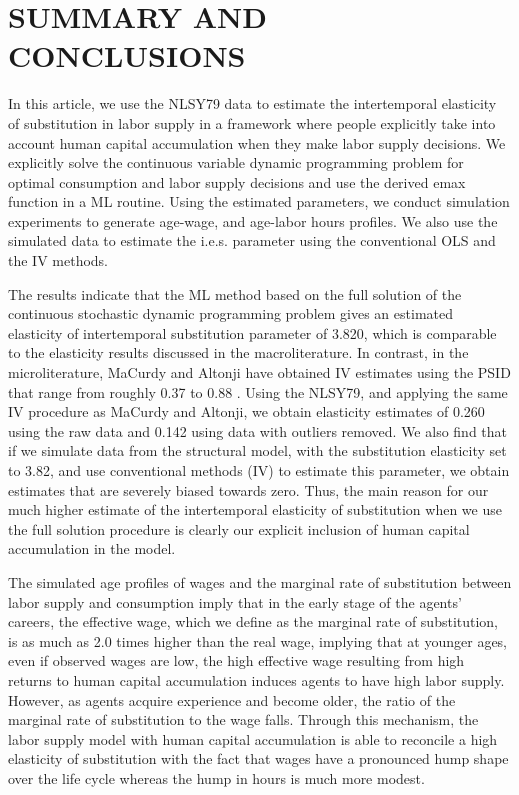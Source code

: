 \documentclass[\econtexRoot/ImaiKeane]{subfiles}
\begin{document}
\section{SUMMARY AND CONCLUSIONS}
\label{section:conclusions}
In this article, we use the NLSY79 data to estimate the intertemporal elasticity of substitution in labor supply in a framework where people explicitly take into account human capital accumulation when they make labor supply decisions. We explicitly solve the continuous variable dynamic programming problem for optimal consumption and labor supply decisions and use the derived emax function in a ML routine. Using the estimated parameters, we conduct simulation experiments to generate age-wage, and age-labor hours profiles. We also use the simulated data to estimate the i.e.s. parameter using the conventional OLS and the IV methods. \par
The results indicate that the ML method based on the full solution of the continuous stochastic dynamic programming problem gives an estimated elasticity of intertemporal substitution parameter of 3.820, which is comparable to the elasticity results discussed in the macroliterature. In contrast, in the microliterature, MaCurdy and Altonji have obtained IV estimates using the PSID that range from roughly 0.37 to 0.88 . Using the NLSY79, and applying the same IV procedure as MaCurdy and Altonji, we obtain elasticity estimates of 0.260 using the raw data and 0.142 using data with outliers removed. We also find that if we simulate data from the structural model, with the substitution elasticity set to 3.82, and use conventional methods (IV) to estimate this parameter, we obtain estimates that are severely biased towards zero. Thus, the main reason for our much higher estimate of the intertemporal elasticity of substitution when we use the full solution procedure is clearly our explicit inclusion of human capital accumulation in the model. \par
The simulated age profiles of wages and the marginal rate of substitution between labor supply and consumption imply that in the early stage of the agents' careers, the effective wage, which we define as the marginal rate of substitution, is as much as 2.0 times higher than the real wage, implying that at younger ages, even if observed wages are low, the high effective wage resulting from high returns to human capital accumulation induces agents to have high labor supply. However, as agents acquire experience and become older, the ratio of the marginal rate of substitution to the wage falls. Through this mechanism, the labor supply model with human capital accumulation is able to reconcile a high elasticity of substitution with the fact that wages have a pronounced hump shape over the life cycle whereas the hump in hours is much more modest. \par
\end{document}
